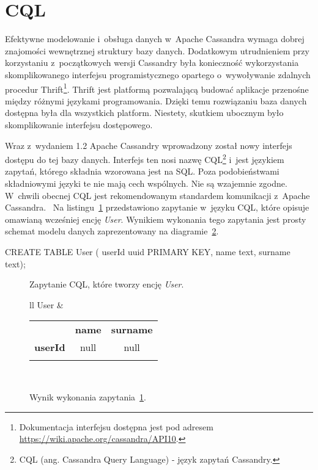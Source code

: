 \section{CQL}

Efektywne modelowanie i~obsługa danych w~Apache Cassandra wymaga dobrej znajomości wewnętrznej struktury bazy danych. Dodatkowym utrudnieniem przy korzystaniu z~początkowych wersji Cassandry była konieczność wykorzystania skomplikowanego interfejsu programistycznego opartego o~wywoływanie zdalnych procedur Thrift\footnote{Dokumentacja interfejsu dostępna jest pod adresem \url{https://wiki.apache.org/cassandra/API10}.}. Thrift jest platformą pozwalającą budować aplikacje przenośne między różnymi językami programowania. Dzięki temu rozwiązaniu baza danych dostępna była dla wszystkich platform. Niestety, skutkiem ubocznym było skomplikowanie interfejsu dostępowego.

Wraz z~wydaniem 1.2 Apache Cassandry wprowadzony został nowy interfejs dostępu do tej bazy danych. Interfejs ten nosi nazwę CQL\footnote{CQL (ang. Cassandra Query Language) - język zapytań Cassandry.} i~jest językiem zapytań, którego składnia wzorowana jest na SQL. Poza podobieństwami składniowymi języki te nie mają cech wspólnych. Nie są wzajemnie zgodne. W~chwili obecnej CQL jest rekomendowanym standardem komunikacji z~Apache Cassandra.~\cite{cql_preferred_over_thrift} Na listingu~\ref{lst:cql_example} przedstawiono zapytanie w~języku CQL, które opisuje omawianą wcześniej encję \emph{User}. Wynikiem wykonania tego zapytania jest prosty schemat modelu danych zaprezentowany na diagramie~\ref{tab:cql_example_query_result}.

\begin{verbbox}
	CREATE TABLE User (
	    userId uuid PRIMARY KEY,
	    name text,
	    surname text);
\end{verbbox}

\begin{figure}[ht!]
	\centering
	\theverbbox

	\caption{Zapytanie CQL, które tworzy encję \emph{User}.}
	\label{lst:cql_example}
\end{figure}

\begin{figure}[ht!]
	\centering

	\begin{tabular}{ll}
		User &
		\begin{tabular}{|l||c|c|}
			\hhline{|-||--|}
			 & \textbf{name} & \textbf{surname} \\
			\hhline{|~||==|}
			\textbf{userId} & null & null \\
			\hhline{|-||--|}
		\end{tabular} \\
	\end{tabular}

	\caption{Wynik wykonania zapytania~\ref{lst:cql_example}.}
	\label{tab:cql_example_query_result}
\end{figure}

